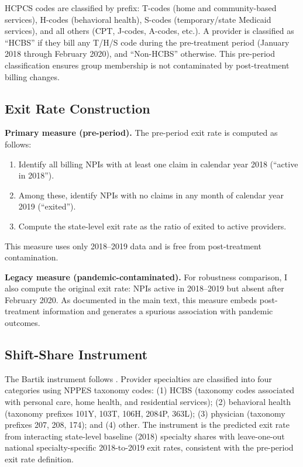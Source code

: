 \documentclass[12pt]{article}
\begin{document}
HCPCS codes are classified by prefix: T-codes (home and community-based services), H-codes (behavioral health), S-codes (temporary/state Medicaid services), and all others (CPT, J-codes, A-codes, etc.). A provider is classified as ``HCBS'' if they bill any T/H/S code during the pre-treatment period (January 2018 through February 2020), and ``Non-HCBS'' otherwise. This pre-period classification ensures group membership is not contaminated by post-treatment billing changes.

\subsection{Exit Rate Construction}

\textbf{Primary measure (pre-period).} The pre-period exit rate is computed as follows:
\begin{enumerate}
\item Identify all billing NPIs with at least one claim in calendar year 2018 (``active in 2018'').
\item Among these, identify NPIs with no claims in any month of calendar year 2019 (``exited'').
\item Compute the state-level exit rate as the ratio of exited to active providers.
\end{enumerate}
This measure uses only 2018--2019 data and is free from post-treatment contamination.

\textbf{Legacy measure (pandemic-contaminated).} For robustness comparison, I also compute the original exit rate: NPIs active in 2018--2019 but absent after February 2020. As documented in the main text, this measure embeds post-treatment information and generates a spurious association with pandemic outcomes.

\subsection{Shift-Share Instrument}

The Bartik instrument follows \citet{goldsmithpinkham2020}. Provider specialties are classified into four categories using NPPES taxonomy codes: (1) HCBS (taxonomy codes associated with personal care, home health, and residential services); (2) behavioral health (taxonomy prefixes 101Y, 103T, 106H, 2084P, 363L); (3) physician (taxonomy prefixes 207, 208, 174); and (4) other. The instrument is the predicted exit rate from interacting state-level baseline (2018) specialty shares with leave-one-out national specialty-specific 2018-to-2019 exit rates, consistent with the pre-period exit rate definition.
\end{document}
